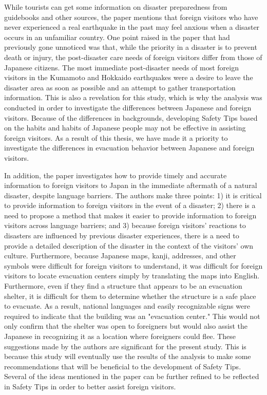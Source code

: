 While tourists can get some information on disaster preparedness from guidebooks and other sources, the paper mentions that foreign visitors who have never experienced a real earthquake in the past may feel anxious when a disaster occurs in an unfamiliar country. One point raised in the paper that had previously gone unnoticed was that, while the priority in a disaster is to prevent death or injury, the post-disaster care needs of foreign visitors differ from those of Japanese citizens. The most immediate post-disaster needs of most foreign visitors in the Kumamoto and Hokkaido earthquakes were a desire to leave the disaster area as soon as possible and an attempt to gather transportation information. This is also a revelation for this study, which is why the analysis was conducted in order to investigate the differences between Japanese and foreign visitors. Because of the differences in backgrounds, developing Safety Tips based on the habits and habits of Japanese people may not be effective in assisting foreign visitors. As a result of this thesis, we have made it a priority to investigate the differences in evacuation behavior between Japanese and foreign visitors.

In addition, the paper investigates how to provide timely and accurate information to foreign visitors to Japan in the immediate aftermath of a natural disaster, despite language barriers. The authors make three points: 1) it is critical to provide information to foreign visitors in the event of a disaster; 2) there is a need to propose a method that makes it easier to provide information to foreign visitors across language barriers; and 3) because foreign visitors' reactions to disasters are influenced by previous disaster experiences, there is a need to provide a detailed description of the disaster in the context of the visitors' own culture. Furthermore, because Japanese maps, kanji, addresses, and other symbols were difficult for foreign visitors to understand, it was difficult for foreign visitors to locate evacuation centers simply by translating the maps into English. Furthermore, even if they find a structure that appears to be an evacuation shelter, it is difficult for them to determine whether the structure is a safe place to evacuate. As a result, national languages and easily recognizable signs were required to indicate that the building was an "evacuation center." This would not only confirm that the shelter was open to foreigners but would also assist the Japanese in recognizing it as a location where foreigners could flee. These suggestions made by the authors are significant for the present study. This is because this study will eventually use the results of the analysis to make some recommendations that will be beneficial to the development of Safety Tips. Several of the ideas mentioned in the paper can be further refined to be reflected in Safety Tips in order to better assist foreign visitors.

